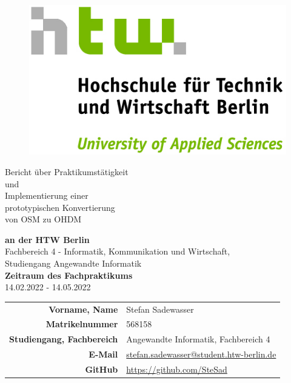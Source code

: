 \pagestyle{empty}
\clearmainofpairofpagestyles
\begin{figure}
	\centering
	\includegraphics{img/htw_logo.jpg}
	\vspace{60pt}
\end{figure}
\begin{center}
	\begin{huge}
		Bericht über Praktikumstätigkeit\\
		und\\
		Implementierung einer \\
		prototypischen Konvertierung\\
		von OSM zu OHDM\\
	\end{huge}\vspace{0.5cm}
	\begin{large}
		\textbf{an der HTW Berlin}\\[0.4cm]
		Fachbereich 4 - Informatik, Kommunikation und Wirtschaft,\\
		Studiengang Angewandte Informatik\\[3cm]
		\textbf{Zeitraum des Fachpraktikums}\\
		14.02.2022 - 14.05.2022\\[1.5cm]
	\end{large}
	
	\begin{normalsize}
		\begin{tabularx}{\linewidth}{R X}
			\textbf{Vorname, Name} & Stefan Sadewasser\\
			\textbf{Matrikelnummer} & 568158\\
			\textbf{Studiengang, Fachbereich} & Angewandte Informatik, Fachbereich 4\\
			\textbf{E-Mail} & \href{mailto:stefan.sadewasser@student.htw-berlin.de}{stefan.sadewasser@student.htw-berlin.de}\\
			\textbf{GitHub} & \url{https://github.com/SteSad}
		\end{tabularx}
	\end{normalsize}\vspace{1cm}
\end{center} 
\newpage

